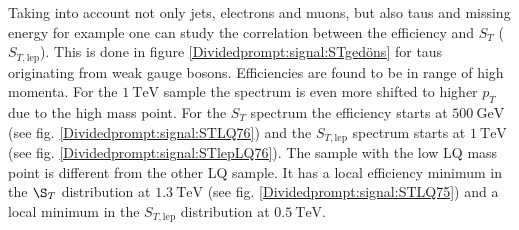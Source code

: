 %
Taking into account not only jets, electrons and muons, but also taus and missing energy for example one can study the correlation between the efficiency and $S_T$ ($S_{T,\text{lep}}$). This is done in figure \ref{Dividedprompt:signal:STgedöns} for taus originating from weak gauge bosons. Efficiencies are found to be in range of high momenta. For the $\SI{1}{\tera\electronvolt}$ sample the spectrum is even more shifted to higher $p_T$ due to the high mass point. For the $S_T$ spectrum the efficiency starts at $\SI{500}{\giga\electronvolt}$ (see fig. \ref{Dividedprompt:signal:STLQ76}) and the $S_{T,\text{lep}}$ spectrum starts at $\SI{1}{\tera\electronvolt}$ (see fig. \ref{Dividedprompt:signal:STlepLQ76}). The sample with the low LQ mass point is different from the other LQ sample. It has a local efficiency minimum in the $\S_T$ distribution at $\SI{1.3}{\tera\electronvolt}$ (see fig. \ref{Dividedprompt:signal:STLQ75}) and a local minimum in the $S_{T,\text{lep}}$ distribution at $\SI{0.5}{\tera\electronvolt}$. \newline
%
